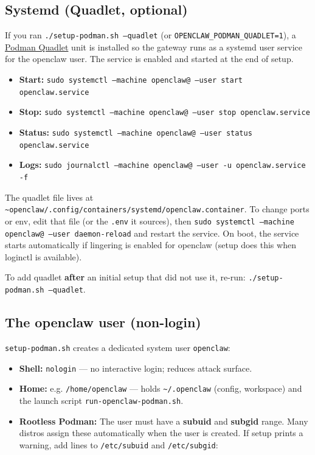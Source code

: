 \subsection{Systemd (Quadlet, optional)}


If you ran \texttt{./setup-podman.sh --quadlet} (or \texttt{OPENCLAW\_PODMAN\_QUADLET=1}), a \href{https://docs.podman.io/en/latest/markdown/podman-systemd.unit.5.html}{Podman Quadlet} unit is installed so the gateway runs as a systemd user service for the openclaw user. The service is enabled and started at the end of setup.

\begin{itemize}
  \item \textbf{Start:} \texttt{sudo systemctl --machine openclaw@ --user start openclaw.service}
  \item \textbf{Stop:} \texttt{sudo systemctl --machine openclaw@ --user stop openclaw.service}
  \item \textbf{Status:} \texttt{sudo systemctl --machine openclaw@ --user status openclaw.service}
  \item \textbf{Logs:} \texttt{sudo journalctl --machine openclaw@ --user -u openclaw.service -f}
\end{itemize}


The quadlet file lives at \texttt{\textasciitilde{}openclaw/.config/containers/systemd/openclaw.container}. To change ports or env, edit that file (or the \texttt{.env} it sources), then \texttt{sudo systemctl --machine openclaw@ --user daemon-reload} and restart the service. On boot, the service starts automatically if lingering is enabled for openclaw (setup does this when loginctl is available).

To add quadlet \textbf{after} an initial setup that did not use it, re-run: \texttt{./setup-podman.sh --quadlet}.

\subsection{The openclaw user (non-login)}


\texttt{setup-podman.sh} creates a dedicated system user \texttt{openclaw}:

\begin{itemize}
  \item \textbf{Shell:} \texttt{nologin} — no interactive login; reduces attack surface.
  \item \textbf{Home:} e.g. \texttt{/home/openclaw} — holds \texttt{\textasciitilde{}/.openclaw} (config, workspace) and the launch script \texttt{run-openclaw-podman.sh}.
  \item \textbf{Rootless Podman:} The user must have a \textbf{subuid} and \textbf{subgid} range. Many distros assign these automatically when the user is created. If setup prints a warning, add lines to \texttt{/etc/subuid} and \texttt{/etc/subgid}:
\end{itemize}


